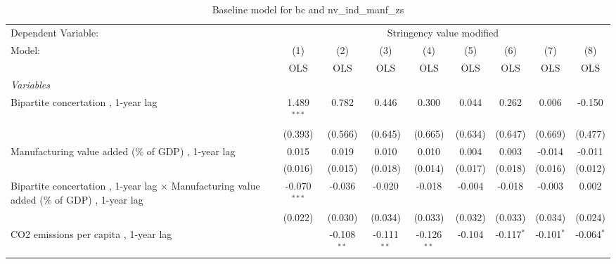 
\begin{table}[htbp]
   \caption{Baseline model for bc and nv\_ind\_manf\_zs}
   \centering
   \begin{tabular}{lcccccccc}
      \toprule
      Dependent Variable: & \multicolumn{8}{c}{Stringency value modified}\\
      Model:                                                                                            & (1)            & (2)           & (3)           & (4)           & (5)           & (6)           & (7)           & (8)\\  
                                                                                                        &  OLS           & OLS           & OLS           & OLS           & OLS           & OLS           & OLS           & OLS\\  
      \midrule
      \emph{Variables}\\
      Bipartite concertation , 1-year lag                                                               & 1.489$^{***}$  & 0.782         & 0.446         & 0.300         & 0.044         & 0.262         & 0.006         & -0.150\\   
                                                                                                        & (0.393)        & (0.566)       & (0.645)       & (0.665)       & (0.634)       & (0.647)       & (0.669)       & (0.477)\\   
      Manufacturing value added (\% of GDP) , 1-year lag                                                & 0.015          & 0.019         & 0.010         & 0.010         & 0.004         & 0.003         & -0.014        & -0.011\\   
                                                                                                        & (0.016)        & (0.015)       & (0.018)       & (0.014)       & (0.017)       & (0.018)       & (0.016)       & (0.012)\\   
      Bipartite concertation , 1-year lag $\times$ Manufacturing value added (\% of GDP) , 1-year lag   & -0.070$^{***}$ & -0.036        & -0.020        & -0.018        & -0.004        & -0.018        & -0.003        & 0.002\\   
                                                                                                        & (0.022)        & (0.030)       & (0.034)       & (0.033)       & (0.032)       & (0.033)       & (0.034)       & (0.024)\\   
      CO2 emissions per capita , 1-year lag                                                             &                & -0.108$^{**}$ & -0.111$^{**}$ & -0.126$^{**}$ & -0.104        & -0.117$^{*}$  & -0.101$^{*}$  & -0.064$^{*}$\\   

\end{tabular}
\end{table}
